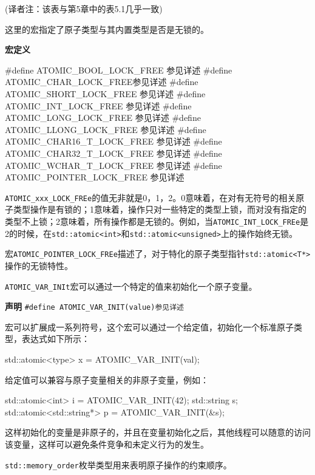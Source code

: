 (译者注：该表与第5章中的表5.1几乎一致)


这里的宏指定了原子类型与其内置类型是否是无锁的。

\textbf{宏定义}

\begin{cpp}
#define ATOMIC_BOOL_LOCK_FREE 参见详述
#define ATOMIC_CHAR_LOCK_FREE参见详述
#define ATOMIC_SHORT_LOCK_FREE 参见详述
#define ATOMIC_INT_LOCK_FREE 参见详述
#define ATOMIC_LONG_LOCK_FREE 参见详述
#define ATOMIC_LLONG_LOCK_FREE 参见详述
#define ATOMIC_CHAR16_T_LOCK_FREE 参见详述
#define ATOMIC_CHAR32_T_LOCK_FREE 参见详述
#define ATOMIC_WCHAR_T_LOCK_FREE 参见详述
#define ATOMIC_POINTER_LOCK_FREE 参见详述
\end{cpp}

\texttt{ATOMIC\_xxx\_LOCK\_FREe}的值无非就是0，1，2。0意味着，在对有无符号的相关原子类型操作是有锁的；1意味着，操作只对一些特定的类型上锁，而对没有指定的类型不上锁；2意味着，所有操作都是无锁的。例如，当\texttt{ATOMIC\_INT\_LOCK\_FREe}是2的时候，在\texttt{std::atomic<int>}和\texttt{std::atomic<unsigned>}上的操作始终无锁。

宏\texttt{ATOMIC\_POINTER\_LOCK\_FREe}描述了，对于特化的原子类型指针\texttt{std::atomic<T*>}操作的无锁特性。


\texttt{ATOMIC\_VAR\_INIt}宏可以通过一个特定的值来初始化一个原子变量。

\textbf{声明}
\texttt{\#define ATOMIC\_VAR\_INIT(value)参见详述}

宏可以扩展成一系列符号，这个宏可以通过一个给定值，初始化一个标准原子类型，表达式如下所示：

\begin{cpp}
std::atomic<type> x = ATOMIC_VAR_INIT(val);
\end{cpp}

给定值可以兼容与原子变量相关的非原子变量，例如：

\begin{cpp}
std::atomic<int> i = ATOMIC_VAR_INIT(42);
std::string s;
std::atomic<std::string*> p = ATOMIC_VAR_INIT(&s);
\end{cpp}

这样初始化的变量是非原子的，并且在变量初始化之后，其他线程可以随意的访问该变量，这样可以避免条件竞争和未定义行为的发生。


\texttt{std::memory\_order}枚举类型用来表明原子操作的约束顺序。


